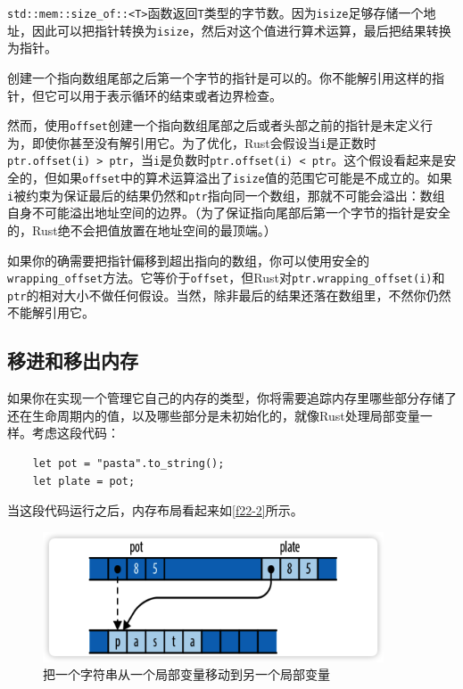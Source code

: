 \texttt{std::mem::size\_of::<T>}函数返回\texttt{T}类型的字节数。因为\texttt{isize}足够存储一个地址，因此可以把指针转换为\texttt{isize}，然后对这个值进行算术运算，最后把结果转换为指针。

创建一个指向数组尾部之后第一个字节的指针是可以的。你不能解引用这样的指针，但它可以用于表示循环的结束或者边界检查。

然而，使用\texttt{offset}创建一个指向数组尾部之后或者头部之前的指针是未定义行为，即使你甚至没有解引用它。为了优化，Rust会假设当\texttt{i}是正数时\texttt{ptr.offset(i) > ptr}，当\texttt{i}是负数时\texttt{ptr.offset(i) < ptr}。这个假设看起来是安全的，但如果\texttt{offset}中的算术运算溢出了\texttt{isize}值的范围它可能是不成立的。如果\texttt{i}被约束为保证最后的结果仍然和\texttt{ptr}指向同一个数组，那就不可能会溢出：数组自身不可能溢出地址空间的边界。（为了保证指向尾部后第一个字节的指针是安全的，Rust绝不会把值放置在地址空间的最顶端。）

如果你的确需要把指针偏移到超出指向的数组，你可以使用安全的\texttt{wrapping\_offset}方法。它等价于\texttt{offset}，但Rust对\texttt{ptr.wrapping\_offset(i)}和\texttt{ptr}的相对大小不做任何假设。当然，除非最后的结果还落在数组里，不然你仍然不能解引用它。

\subsection{移进和移出内存}
如果你在实现一个管理它自己的内存的类型，你将需要追踪内存里哪些部分存储了还在生命周期内的值，以及哪些部分是未初始化的，就像Rust处理局部变量一样。考虑这段代码：
\begin{verbatim}
    let pot = "pasta".to_string();
    let plate = pot;
\end{verbatim}

当这段代码运行之后，内存布局看起来如\autoref{f22-2}所示。

\begin{figure}[htbp]
    \centering
    \includegraphics[width=0.9\textwidth]{../img/f22-2.png}
    \caption{把一个字符串从一个局部变量移动到另一个局部变量}
    \label{f22-2}
\end{figure}

